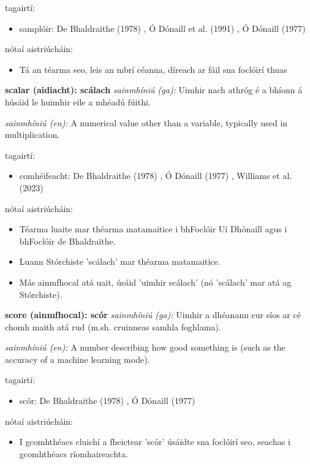 \documentclass{article}
\begin{document}
tagairtí:
\begin{itemize}
	\item samplóir: De Bhaldraithe (1978) \cite{de-bhaldraithe}, Ó Dónaill et al. (1991) \cite{focloir-beag}, Ó Dónaill (1977) \cite{odonaill}
\end{itemize}

nótaí aistriúcháin:
\begin{itemize}
	\item Tá an téarma seo, leis an mbrí céanna, díreach ar fáil sna foclóirí thuas
\end{itemize}


\textbf{scalar (aidiacht): scálach}
\textit{sainmhíniú (ga):} Uimhir nach athróg é a bhíonn á húsáid le huimhir eile a mhéadú fúithi.

\textit{sainmhíniú (en):} A numerical value other than a variable, typically used in multiplication.

tagairtí:
\begin{itemize}
	\item comhéifeacht: De Bhaldraithe (1978) \cite{de-bhaldraithe}, Ó Dónaill (1977) \cite{odonaill}, Williams et al. (2023) \cite{storchiste}
\end{itemize}

nótaí aistriúcháin:
\begin{itemize}
	\item Téarma luaite mar théarma matamaitice i bhFoclóir Uí Dhónaill agus i bhFoclóir de Bhaldraithe.
	\item Luann Stórchiste 'scálach' mar théarma matamaitice.
	\item Más ainmfhocal atá uait, úsáid 'uimhir scálach' (nó 'scálach' mar atá ag Stórchiste).
\end{itemize}


\textbf{score (ainmfhocal): scór}
\textit{sainmhíniú (ga):} Uimhir a dhéanann cur síos ar cé chomh maith atá rud (m.sh. cruinneas samhla foghlama).

\textit{sainmhíniú (en):} A number describing how good something is (such as the accuracy of a machine learning mode).

tagairtí:
\begin{itemize}
	\item scór: De Bhaldraithe (1978) \cite{de-bhaldraithe}, Ó Dónaill (1977) \cite{odonaill}
\end{itemize}

nótaí aistriúcháin:
\begin{itemize}
	\item I gcomhthéacs cluichí a fheictear 'scór' úsáidte sna foclóirí seo, seachas i gcomhthéacs ríomhaireachta.
\end{itemize}
\end{document}
